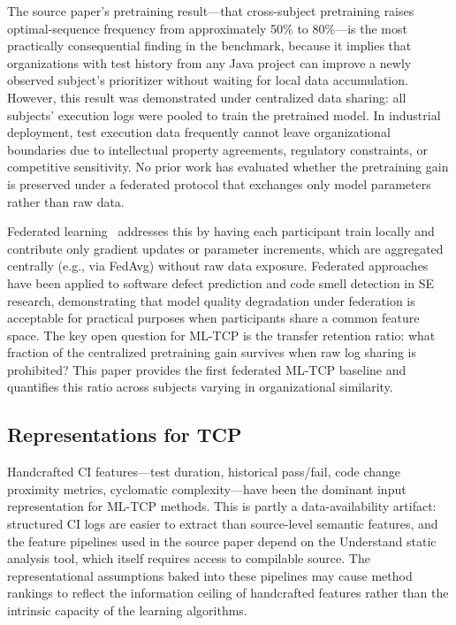 \documentclass[10pt,conference]{IEEEtran}
\begin{document}
The source paper's pretraining result---that cross-subject pretraining raises optimal-sequence frequency from approximately 50\% to 80\%---is the most practically consequential finding in the benchmark, because it implies that organizations with test history from any Java project can improve a newly observed subject's prioritizer without waiting for local data accumulation. However, this result was demonstrated under centralized data sharing: all subjects' execution logs were pooled to train the pretrained model. In industrial deployment, test execution data frequently cannot leave organizational boundaries due to intellectual property agreements, regulatory constraints, or competitive sensitivity. No prior work has evaluated whether the pretraining gain is preserved under a federated protocol that exchanges only model parameters rather than raw data.

Federated learning~\cite{federatedlearning} addresses this by having each participant train locally and contribute only gradient updates or parameter increments, which are aggregated centrally (e.g., via FedAvg) without raw data exposure. Federated approaches have been applied to software defect prediction and code smell detection in SE research, demonstrating that model quality degradation under federation is acceptable for practical purposes when participants share a common feature space. The key open question for ML-TCP is the transfer retention ratio: what fraction of the centralized pretraining gain survives when raw log sharing is prohibited? This paper provides the first federated ML-TCP baseline and quantifies this ratio across subjects varying in organizational similarity.

\subsection{Representations for TCP}

Handcrafted CI features---test duration, historical pass/fail, code change proximity metrics, cyclomatic complexity---have been the dominant input representation for ML-TCP methods. This is partly a data-availability artifact: structured CI logs are easier to extract than source-level semantic features, and the feature pipelines used in the source paper depend on the Understand static analysis tool, which itself requires access to compilable source. The representational assumptions baked into these pipelines may cause method rankings to reflect the information ceiling of handcrafted features rather than the intrinsic capacity of the learning algorithms.
\end{document}
